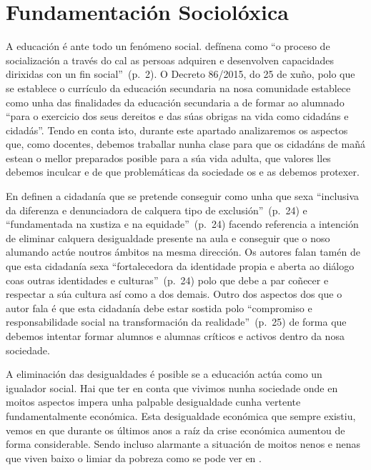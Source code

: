
\section{Fundamentación Sociolóxica}

A educación é ante todo un fenómeno social.  defínena como ``o proceso de socialización a través do cal as persoas adquiren e desenvolven capacidades dirixidas con un fin social''~(p.~2). O Decreto 86/2015, do 25 de xuño, polo que se establece o currículo da educación secundaria na nosa comunidade establece como unha das finalidades da educación secundaria a de formar ao alumnado ``para o exercicio dos seus dereitos e das súas obrigas na vida como cidadáns e cidadás''. Tendo en conta isto, durante este apartado analizaremos os aspectos que, como docentes, debemos traballar nunha clase para que os cidadáns de mañá estean o mellor preparados posible para a súa vida adulta, que valores lles debemos inculcar e de que problemáticas da sociedade os e as debemos protexer.

En  definen a cidadanía que se pretende conseguir como unha que sexa ``inclusiva da diferenza e denunciadora de calquera tipo de exclusión''~(p.~24) e ``fundamentada na xustiza e na equidade''~(p.~24) facendo referencia a intención de eliminar calquera desigualdade presente na aula e conseguir que o noso alumando actúe noutros ámbitos na mesma dirección. Os autores falan tamén de que esta cidadanía sexa ``fortalecedora da identidade propia e aberta ao diálogo coas outras identidades e culturas''~(p.~24) polo que debe a par coñecer e respectar a súa cultura así como a dos demais. Outro dos aspectos dos que o autor fala é que esta cidadanía debe estar sostida polo ``compromiso e responsabilidade social na transformación da realidade''~(p.~25) de forma que debemos intentar formar alumnos e alumnas críticos e activos dentro da nosa sociedade.

A eliminación das desigualdades é posible se a educación actúa como un igualador social. Hai que ter en conta que vivimos nunha sociedade onde en moitos aspectos impera unha palpable desigualdade cunha vertente fundamentalmente económica. Esta desigualdade económica que sempre existiu, vemos en  que durante os últimos anos a raíz da crise económica aumentou de forma considerable. Sendo incluso alarmante a situación de moitos nenos e nenas que viven baixo o limiar da pobreza como se pode ver en .

